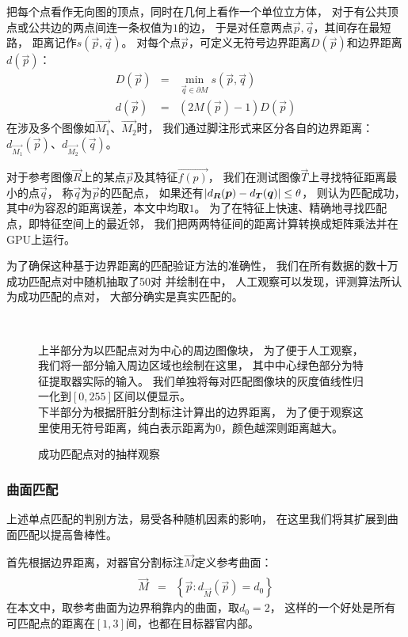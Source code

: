 把每个点看作无向图的顶点，同时在几何上看作一个单位立方体，
对于有公共顶点或公共边的两点间连一条权值为$1$的边，
于是对任意两点$\vec{p}, \vec{q}$，其间存在最短路，
距离记作$s(\vec{p}, \vec{q})$。
对每个点$\vec{p}$，可定义无符号边界距离$D(\vec{p})$和边界距离$d(\vec{p})$：
\begin{eqnarray}
    D(\vec{p}) &=& \min_{\vec{q} \in \partial M} s(\vec{p}, \vec{q}) \\
    d(\vec{p}) &=& (2M(\vec{p})-1)D(\vec{p})
\end{eqnarray}
在涉及多个图像如$\vec{M_1}$、$\vec{M_2}$时，
我们通过脚注形式来区分各自的边界距离：
$d_{\vec{M_1}}(\vec{p})$、$d_{\vec{M_2}}(\vec{q})$。

对于参考图像$\vec{R}$上的某点$\vec{p}$及其特征$\vec{f(p)}$，
我们在测试图像$\vec{T}$上寻找特征距离最小的点$\vec{q}$，
称$\vec{q}$为$\vec{p}$的匹配点，
如果还有$\left|d_{\boldsymbol{R}}(\boldsymbol{p}) - d_{\boldsymbol{T}}(\boldsymbol{q})\right| \le \theta$，
则认为匹配成功，其中$\theta$为容忍的距离误差，本文中均取$1$。
为了在特征上快速、精确地寻找匹配点，即特征空间上的最近邻，
我们把两两特征间的距离计算转换成矩阵乘法并在GPU上运行。

为了确保这种基于边界距离的匹配验证方法的准确性，
我们在所有数据的数十万成功匹配点对中随机抽取了50对
并绘制在中，
人工观察可以发现，评测算法所认为成功匹配的点对，
大部分确实是真实匹配的。
\begin{figure}[h!]
    {
         \\
        \vspace{0.2em}
        \caption{成功匹配点对的抽样观察}
        \label{fig:expr:pt:match}
    }
    \footnotesize
    上半部分为以匹配点对为中心的周边图像块，
    为了便于人工观察，我们将一部分输入周边区域也绘制在这里，
    其中中心绿色部分为特征提取器实际的输入。
    我们单独将每对匹配图像块的灰度值线性归一化到$[0, 255]$区间以便显示。 \\
    下半部分为根据肝脏分割标注计算出的边界距离，
    为了便于观察这里使用无符号距离，纯白表示距离为$0$，颜色越深则距离越大。
\end{figure}

\subsubsection{曲面匹配\label{sec:expr:match}}
上述单点匹配的判别方法，易受各种随机因素的影响，
在这里我们将其扩展到曲面匹配以提高鲁棒性。

首先根据边界距离，对器官分割标注$\vec{M}$定义参考曲面：
\begin{eqnarray}
    \hat{\vec{M}} &=& \left\{ \vec{p} : d_{\vec{M}}(\vec{p}) = d_0 \right\}
\end{eqnarray}
在本文中，取参考曲面为边界稍靠内的曲面，取$d_0=2$，
这样的一个好处是所有可匹配点的距离在$[1, 3]$间，也都在目标器官内部。

